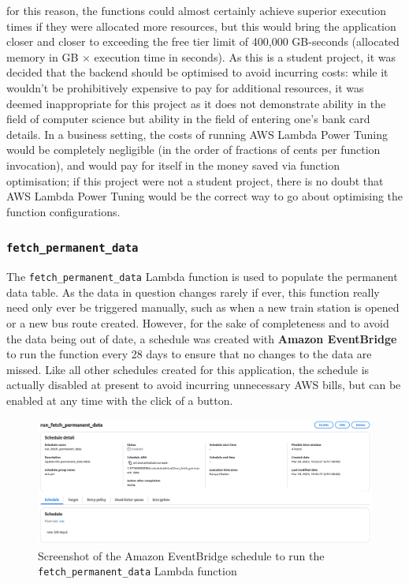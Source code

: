 \documentclass[a4paper,11pt]{report}
\begin{document}
for this reason, the functions could almost certainly achieve superior execution times if they were allocated more resources, but this would bring the application closer and closer to exceeding the free tier limit of 400,000 GB-seconds (allocated memory in GB $\times$ execution time in seconds).
As this is a student project, it was decided that the backend should be optimised to avoid incurring costs:
while it wouldn't be prohibitively expensive to pay for additional resources, it was deemed inappropriate for this project as it does not demonstrate ability in the field of computer science but ability in the field of entering one's bank card details.
In a business setting, the costs of running AWS Lambda Power Tuning would be completely negligible (in the order of fractions of cents per function invocation), and would pay for itself in the money saved via function optimisation;
if this project were not a student project, there is no doubt that AWS Lambda Power Tuning would be the correct way to go about optimising the function configurations.

\subsubsection{\texttt{fetch_permanent_data}}
The \verb|fetch_permanent_data| Lambda function is used to populate the permanent data table.
As the data in question changes rarely if ever, this function really need only ever be triggered manually, such as when a new train station is opened or a new bus route created.
However, for the sake of completeness and to avoid the data being out of date, a schedule was created with \textbf{Amazon EventBridge} to run the function every 28 days to ensure that no changes to the data are missed.
Like all other schedules created for this application, the schedule is actually disabled at present to avoid incurring unnecessary AWS bills, but can be enabled at any time with the click of a button.

\begin{figure}[H]
    \centering
    \includegraphics[width=\textwidth]{./images/fetch_permanent_data_schedule.png}
    \caption{Screenshot of the Amazon EventBridge schedule to run the \texttt{fetch_permanent_data} Lambda function}
\end{figure}
\end{document}
